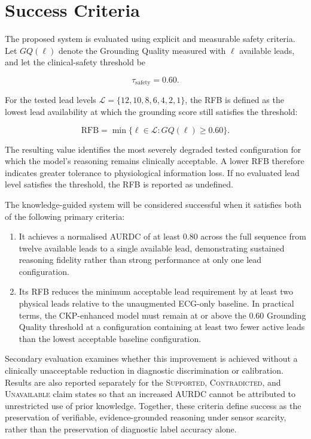 \documentclass{ssnreview}
\begin{document}
\section{Success Criteria}

The proposed system is evaluated using explicit and measurable safety criteria. Let
$GQ(\ell)$ denote the Grounding Quality measured with $\ell$ available leads, and
let the clinical-safety threshold be

\begin{equation}
  \tau_{\mathrm{safety}} = 0.60.
\end{equation}

For the tested lead levels $\mathcal{L}=\{12,10,8,6,4,2,1\}$, the RFB is defined as
the lowest lead availability at which the grounding score still satisfies the threshold:

\begin{equation}
  \mathrm{RFB}=\min\{\ell\in\mathcal{L}:GQ(\ell)\geq 0.60\}.
\end{equation}

The resulting value identifies the most severely degraded tested configuration for which
the model's reasoning remains clinically acceptable. A lower RFB therefore indicates
greater tolerance to physiological information loss. If no evaluated lead level satisfies
the threshold, the RFB is reported as undefined.

The knowledge-guided system will be considered successful when it satisfies both of the
following primary criteria:

\begin{enumerate}[label=\arabic*.,leftmargin=*,align=left]
  \item It achieves a normalised AURDC of at least $0.80$ across the full sequence from
  twelve available leads to a single available lead, demonstrating sustained reasoning
  fidelity rather than strong performance at only one lead configuration.

  \item Its RFB reduces the minimum acceptable lead requirement by at least two physical
  leads relative to the unaugmented ECG-only baseline. In practical terms, the CKP-enhanced
  model must remain at or above the $0.60$ Grounding Quality threshold at a configuration
  containing at least two fewer active leads than the lowest acceptable baseline
  configuration.
\end{enumerate}

Secondary evaluation examines whether this improvement is achieved without a clinically
unacceptable reduction in diagnostic discrimination or calibration. Results are also
reported separately for the \textsc{Supported}, \textsc{Contradicted}, and
\textsc{Unavailable} claim states so that an increased AURDC cannot be attributed to
unrestricted use of prior knowledge. Together, these criteria define success as the
preservation of verifiable, evidence-grounded reasoning under sensor scarcity, rather than
the preservation of diagnostic label accuracy alone.
\end{document}
